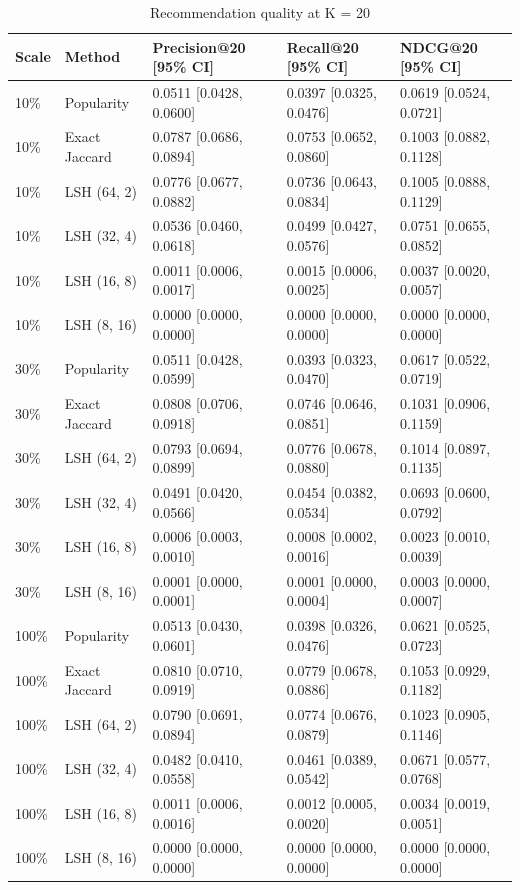 \begin{table}[ht]\centering
\caption{Recommendation quality at K = 20}
\begin{tabular}{lllll}
\hline
Scale & Method & Precision@20 [95\% CI] & Recall@20 [95\% CI] & NDCG@20 [95\% CI] \\
\hline
10\% & Popularity & 0.0511 [0.0428, 0.0600] & 0.0397 [0.0325, 0.0476] & 0.0619 [0.0524, 0.0721] \\
10\% & Exact Jaccard & 0.0787 [0.0686, 0.0894] & 0.0753 [0.0652, 0.0860] & 0.1003 [0.0882, 0.1128] \\
10\% & LSH (64, 2) & 0.0776 [0.0677, 0.0882] & 0.0736 [0.0643, 0.0834] & 0.1005 [0.0888, 0.1129] \\
10\% & LSH (32, 4) & 0.0536 [0.0460, 0.0618] & 0.0499 [0.0427, 0.0576] & 0.0751 [0.0655, 0.0852] \\
10\% & LSH (16, 8) & 0.0011 [0.0006, 0.0017] & 0.0015 [0.0006, 0.0025] & 0.0037 [0.0020, 0.0057] \\
10\% & LSH (8, 16) & 0.0000 [0.0000, 0.0000] & 0.0000 [0.0000, 0.0000] & 0.0000 [0.0000, 0.0000] \\
30\% & Popularity & 0.0511 [0.0428, 0.0599] & 0.0393 [0.0323, 0.0470] & 0.0617 [0.0522, 0.0719] \\
30\% & Exact Jaccard & 0.0808 [0.0706, 0.0918] & 0.0746 [0.0646, 0.0851] & 0.1031 [0.0906, 0.1159] \\
30\% & LSH (64, 2) & 0.0793 [0.0694, 0.0899] & 0.0776 [0.0678, 0.0880] & 0.1014 [0.0897, 0.1135] \\
30\% & LSH (32, 4) & 0.0491 [0.0420, 0.0566] & 0.0454 [0.0382, 0.0534] & 0.0693 [0.0600, 0.0792] \\
30\% & LSH (16, 8) & 0.0006 [0.0003, 0.0010] & 0.0008 [0.0002, 0.0016] & 0.0023 [0.0010, 0.0039] \\
30\% & LSH (8, 16) & 0.0001 [0.0000, 0.0001] & 0.0001 [0.0000, 0.0004] & 0.0003 [0.0000, 0.0007] \\
100\% & Popularity & 0.0513 [0.0430, 0.0601] & 0.0398 [0.0326, 0.0476] & 0.0621 [0.0525, 0.0723] \\
100\% & Exact Jaccard & 0.0810 [0.0710, 0.0919] & 0.0779 [0.0678, 0.0886] & 0.1053 [0.0929, 0.1182] \\
100\% & LSH (64, 2) & 0.0790 [0.0691, 0.0894] & 0.0774 [0.0676, 0.0879] & 0.1023 [0.0905, 0.1146] \\
100\% & LSH (32, 4) & 0.0482 [0.0410, 0.0558] & 0.0461 [0.0389, 0.0542] & 0.0671 [0.0577, 0.0768] \\
100\% & LSH (16, 8) & 0.0011 [0.0006, 0.0016] & 0.0012 [0.0005, 0.0020] & 0.0034 [0.0019, 0.0051] \\
100\% & LSH (8, 16) & 0.0000 [0.0000, 0.0000] & 0.0000 [0.0000, 0.0000] & 0.0000 [0.0000, 0.0000] \\
\hline
\end{tabular}
\end{table}
